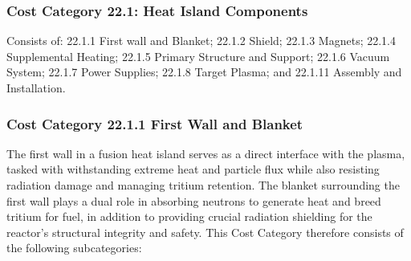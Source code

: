 \subsubsection{Cost Category 22.1: Heat Island Components}

Consists of: 22.1.1 First wall and Blanket; 22.1.2 Shield; 22.1.3 Magnets; 22.1.4 Supplemental Heating; 22.1.5 Primary Structure and Support; 22.1.6 Vacuum System; 22.1.7 Power Supplies; 22.1.8 Target Plasma; and 22.1.11 Assembly and Installation. 


\subsubsection*{Cost Category 22.1.1 First Wall and Blanket} 

The first wall in a fusion heat island serves as a direct interface with the plasma, tasked with withstanding extreme heat and particle flux while also resisting radiation damage and managing tritium retention. The blanket surrounding the first wall plays a dual role in absorbing neutrons to generate heat and breed tritium for fuel, in addition to providing crucial radiation shielding for the reactor's structural integrity and safety.  This Cost Category therefore consists of the following subcategories:


